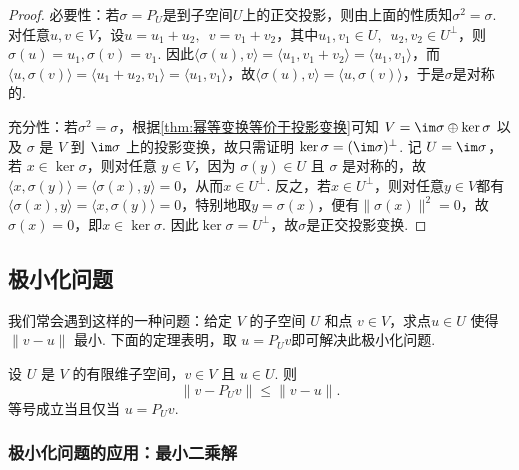 \begin{proof}
    必要性：若$\sigma=P_U$是到子空间$U$上的正交投影，则由上面的性质知$\sigma^2=\sigma$. 对任意$u,v\in V$，设$u=u_1+u_2,\enspace v=v_1+v_2$，其中$u_1,v_1\in U,\enspace u_2,v_2\in U^\perp$，则$\sigma(u)=u_1,\sigma(v)=v_1$. 因此$\langle \sigma(u),v\rangle=\langle u_1,v_1+v_2\rangle=\langle u_1,v_1\rangle$，而$\langle u,\sigma(v)\rangle=\langle u_1+u_2,v_1\rangle=\langle u_1,v_1\rangle$，故$\langle \sigma(u),v\rangle=\langle u,\sigma(v)\rangle$，于是$\sigma$是对称的.

    充分性：若$\sigma^2=\sigma$，根据\autoref{thm:幂等变换等价于投影变换}可知 $V = \im \sigma \oplus \ker \sigma$ 以及 $\sigma$ 是 $V$ 到 $\im \sigma$ 上的投影变换，故只需证明 $\ker \sigma = (\im \sigma)^\perp$. 记 $U = \im \sigma$，若 $x\in\ker \sigma$，则对任意 $y\in V$，因为 $\sigma(y)\in U$ 且 $\sigma$ 是对称的，故$\langle x,\sigma(y)\rangle=\langle \sigma(x),y\rangle=0$，从而$x\in U^\perp$. 反之，若$x\in U^\perp$，则对任意$y\in V$都有$\langle \sigma(x),y\rangle=\langle x,\sigma(y)\rangle=0$，特别地取$y=\sigma(x)$，便有$\lVert \sigma(x)\rVert^2=0$，故$\sigma(x)=0$，即$x\in\ker \sigma$. 因此$\ker \sigma=U^\perp$，故$\sigma$是正交投影变换.
\end{proof}

\subsection{极小化问题}

我们常会遇到这样的一种问题：给定 $ V $ 的子空间 $ U $ 和点 $ v \in V $，求点$ u \in U $ 使得 $ \lVert v - u \rVert $ 最小. 下面的定理表明，取 $ u = P_U v$即可解决此极小化问题.

\begin{theorem}{}{}
    设 $ U $ 是 $ V $ 的有限维子空间，$ v \in V $ 且 $ u \in U $. 则
    \[\lVert v - P_U v \rVert \leqslant \lVert v - u \rVert. \]
    等号成立当且仅当 $ u = P_U v $.
\end{theorem}

\subsubsection*{极小化问题的应用：最小二乘解}

